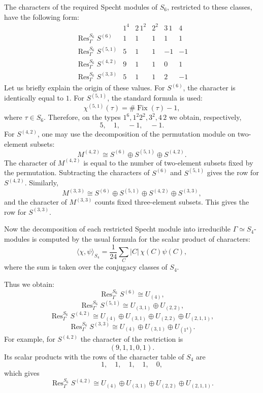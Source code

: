 \documentclass[12pt,reqno]{amsart}
\begin{document}
The characters of the required Specht modules of $S_6$, restricted to these
classes, have the following form:
$$
\begin{array}{c|ccccc}
 & 1^4 & 2\,1^2 & 2^2 & 3\,1 & 4\\
\hline
\operatorname{Res}^{S_6}_{\Gamma}S^{(6)}
    & 1 & 1 & 1 & 1 & 1\\
\operatorname{Res}^{S_6}_{\Gamma}S^{(5,1)}
    & 5 & 1 & 1 & -1 & -1\\
\operatorname{Res}^{S_6}_{\Gamma}S^{(4,2)}
    & 9 & 1 & 1 & 0 & 1\\
\operatorname{Res}^{S_6}_{\Gamma}S^{(3,3)}
    & 5 & 1 & 1 & 2 & -1
\end{array}
$$
Let us briefly explain the origin of these values. For $S^{(6)}$, the
character is identically equal to $1$. For $S^{(5,1)}$, the standard formula
is used:
$$
\chi^{(5,1)}(\tau)=\#\operatorname{Fix}(\tau)-1,
$$
where $\tau\in S_6$. Therefore, on the types $1^6,1^2 2^2,3^2,4\,2$ we
obtain, respectively,
$$
5,\quad 1,\quad -1,\quad -1.
$$
For $S^{(4,2)}$, one may use the decomposition of the permutation module on
two-element subsets:
$$
M^{(4,2)}\cong S^{(6)}\oplus S^{(5,1)}\oplus S^{(4,2)}.
$$
The character of $M^{(4,2)}$ is equal to the number of two-element subsets
fixed by the permutation. Subtracting the characters of $S^{(6)}$ and
$S^{(5,1)}$ gives the row for $S^{(4,2)}$. Similarly,
$$
M^{(3,3)}
\cong
S^{(6)}\oplus S^{(5,1)}\oplus S^{(4,2)}\oplus S^{(3,3)},
$$
and the character of $M^{(3,3)}$ counts fixed three-element subsets. This
gives the row for $S^{(3,3)}$.

Now the decomposition of each restricted Specht module into irreducible
$\Gamma\simeq S_4$-modules is computed by the usual formula for the scalar
product of characters:
$$
\langle \chi,\psi\rangle_{S_4}
=
\frac1{24}\sum_{C}|C|\,\chi(C)\psi(C),
$$
where the sum is taken over the conjugacy classes of $S_4$.

Thus we obtain:
$$
\operatorname{Res}^{S_6}_{\Gamma}S^{(6)}
\cong
U_{(4)},
$$
$$
\operatorname{Res}^{S_6}_{\Gamma}S^{(5,1)}
\cong
U_{(3,1)}\oplus U_{(2,2)},
$$
$$
\operatorname{Res}^{S_6}_{\Gamma}S^{(4,2)}
\cong
U_{(4)}\oplus U_{(3,1)}\oplus U_{(2,2)}
\oplus U_{(2,1,1)},
$$
$$
\operatorname{Res}^{S_6}_{\Gamma}S^{(3,3)}
\cong
U_{(4)}\oplus U_{(3,1)}\oplus U_{(1^4)}.
$$
For example, for $S^{(4,2)}$ the character of the restriction is
$$
(9,1,1,0,1).
$$
Its scalar products with the rows of the character table of $S_4$ are
$$
1,\quad 1,\quad 1,\quad 1,\quad 0,
$$
which gives
$$
\operatorname{Res}^{S_6}_{\Gamma}S^{(4,2)}
\cong
U_{(4)}\oplus U_{(3,1)}\oplus U_{(2,2)}
\oplus U_{(2,1,1)}.
$$
\end{document}
